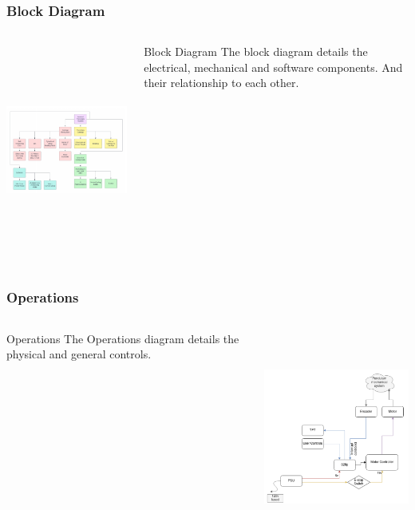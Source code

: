 \documentclass[aspectratio=169]{beamer}
\begin{document}
\begin{frame}
    \frametitle{Block Diagram}

    \begin{columns}
        \begin{column}{0.70\textwidth}
            \includegraphics[height=7cm]{BlockDiagram}
        \end{column}

        \begin{column}{0.30\textwidth}
            \begin{block}{Block Diagram}
                The block diagram details the electrical, mechanical and software components.
                And their relationship to each other.
            \end{block}
        \end{column}
    \end{columns}
\end{frame}

\begin{frame}
    \frametitle{Operations}

    \begin{columns}
        \begin{column}{0.30\textwidth}
            \begin{block}{Operations}
                The Operations diagram details the physical and general controls.
            \end{block}
        \end{column}

        \begin{column}{0.70\textwidth}
            \includegraphics[height=7cm]{Operations}
        \end{column}
    \end{columns}
\end{frame}
\end{document}
